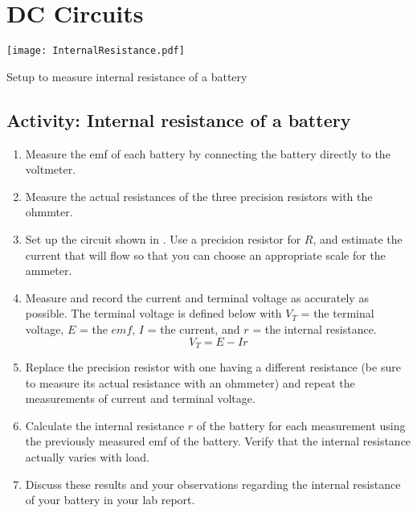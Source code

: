 \newpage
\section {DC Circuits}

\begin{marginfigure}
	\centering
	\texttt{[image: InternalResistance.pdf]}
	\caption{Setup to measure internal resistance of a battery}
	\label{f:vimtr}
\end{marginfigure}

\subsection{Activity: Internal resistance of a battery}
\begin{enumerate}
	\item Measure the emf of each battery by connecting the battery directly to the voltmeter.
	\item Measure the actual resistances of the three precision resistors with the ohmmter.
	 \item Set up the circuit shown in .  Use a precision resistor for $R$, and estimate the current that will flow so that you can choose an appropriate scale for the ammeter.
	\item Measure and record the current and terminal voltage as accurately as possible. The terminal voltage is defined below with $V_T$ = the terminal voltage, $E$ = the $emf$, $I$ = the current, and $r$ = the internal resistance.
\begin{equation} \label{e:vterm}
	V_T  =  E -Ir 	%
\end{equation}
	\item Replace the precision resistor with one having a different resistance (be sure to measure its actual resistance with an ohmmeter) and repeat the measurements of current and terminal voltage.
	\item Calculate the internal resistance $r$ of the battery for each measurement using the previously measured emf of the battery.  Verify that the internal resistance actually varies with load.
	\item Discuss these results and your observations regarding the internal resistance of your battery in your lab report.
\end{enumerate}



